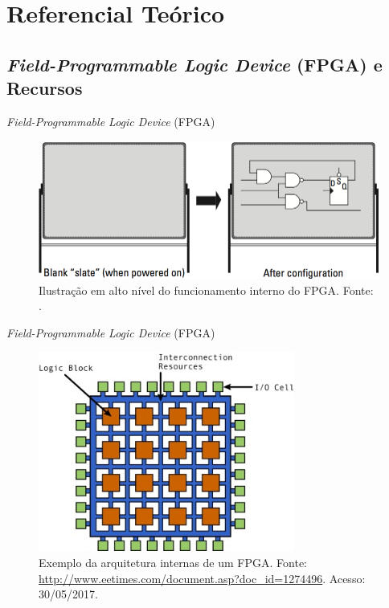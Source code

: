 \section{Referencial Teórico}
   \subsection{{\it Field-Programmable Logic Device} (FPGA) e Recursos}
      
      \begin{frame}{\textit{Field-Programmable Logic Device} (FPGA)}
         \begin{figure}[h] \centering
            \includegraphics[width=1\textwidth]{img/rt-board.png}
            \caption{Ilustração em alto nível do funcionamento interno do FPGA. Fonte: \cite{Sass2010}.}
         \end{figure}
      \end{frame}
   
      \begin{frame}{\textit{Field-Programmable Logic Device} (FPGA)} \vspace{-1.3em}
         \begin{figure}[h] \centering
            \includegraphics[width=0.75\textwidth]{img/rt-arch_fpga.jpg}
            \caption{Exemplo da arquitetura internas de um FPGA. Fonte: \url{http://www.eetimes.com/document.asp?doc_id=1274496}. Acesso: 30/05/2017.}
         \end{figure}
      \end{frame}
      
